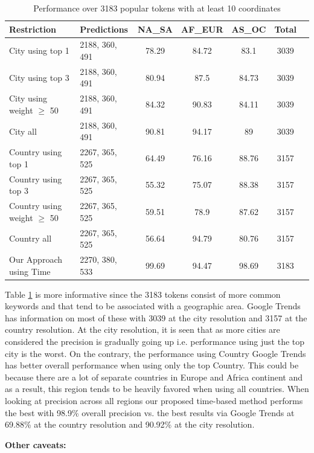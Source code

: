 \begin{table}[htbp]
\small
\caption{Performance over 3183 popular tokens with at least 10 coordinates}
\label{table_5new_3}
\centering
\begin{tabular}{|l|l|c|c|c|c|c|}
\hline
\bfseries Restriction & \bfseries Predictions & \bfseries NA\_SA & \bfseries AF\_EUR & \bfseries AS\_OC & \bfseries Total\\
\hline
City using top 1&2188, 360, 491&78.29&84.72&83.1&3039\\
\hline
City using top 3&2188, 360, 491&80.94&87.5&84.73&3039\\
\hline
City using weight $\geq$ 50&2188, 360, 491&84.32&90.83&84.11&3039\\
\hline
City all &2188, 360, 491&90.81&94.17&89&3039\\
\hline
Country using top 1&2267, 365, 525&64.49&76.16&88.76&3157\\
\hline	
Country using top 3&2267, 365, 525&55.32&75.07&88.38&3157\\
\hline
Country using weight $\geq$ 50&2267, 365, 525&59.51&78.9&87.62&3157\\
\hline	
Country all&2267, 365, 525&56.64&94.79&80.76&3157\\
\hline
Our Approach using Time & 2270, 380, 533 & 99.69 & 94.47 & 98.69 & 3183\\
\hline
\end{tabular}
\end{table}

Table \ref{table_5new_3} is more informative since the 3183 tokens consist of more common keywords and that tend to be associated with a geographic area. Google Trends has information on most of these with 3039 at the city resolution and 3157 at the country resolution. At the city resolution, it is seen that as more cities are considered the precision is gradually going up i.e. performance using just the top city is the worst. On the contrary, the performance using Country Google Trends has better overall performance when using only the top Country. This could be because there are a lot of separate countries in Europe and Africa continent and as a result, this region tends to be heavily favored when using all countries. When looking at precision across all regions our proposed time-based method performs the best with 98.9\% overall precision vs. the best results via Google Trends at 69.88\% at the country resolution and 90.92\% at the city resolution.

\textbf{Other caveats:}

